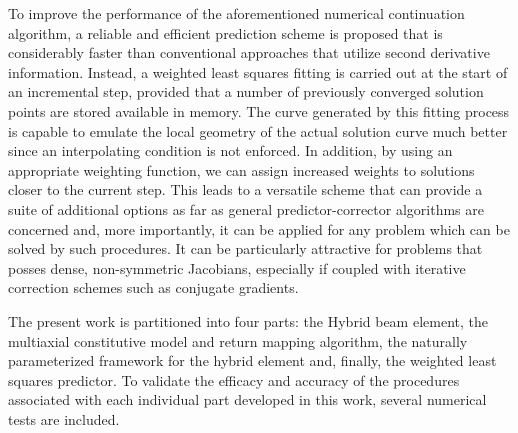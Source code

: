 To improve the performance of the aforementioned numerical continuation algorithm, a 
reliable and efficient prediction scheme is proposed that is considerably faster than 
conventional approaches that utilize second derivative information. Instead, a 
weighted least squares fitting is carried out at the start of an incremental step, 
provided that a number of previously converged solution points are stored available in 
memory. The curve generated by this fitting process is capable to emulate the local 
geometry of the actual solution curve much better since an interpolating condition is 
not enforced. In addition, by using an appropriate weighting function, we can assign 
increased weights to solutions closer to the current step. This leads to a versatile 
scheme that can provide a suite of additional options as far as general 
predictor-corrector algorithms are concerned and, more importantly, it can be applied 
for any problem which can be solved by such procedures. It can be particularly 
attractive for problems that posses dense, non-symmetric Jacobians, especially if 
coupled with iterative correction schemes such as conjugate gradients.

The present work is partitioned into four parts: the Hybrid beam element, the 
multiaxial constitutive model and return mapping algorithm, the naturally 
parameterized framework for the hybrid element and, finally, the weighted least 
squares predictor. To validate the efficacy and accuracy of the procedures associated 
with each individual part developed in this work, several numerical tests are 
included. 